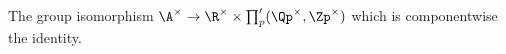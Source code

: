The group isomorphism $\A^\times\to\R^\times\times\prod'_p(\Qp^\times,\Zp^\times)$ which is componentwise the identity.

